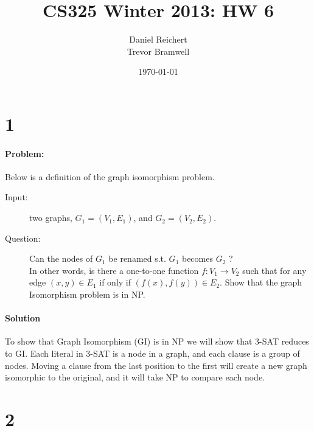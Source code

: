 \documentclass[12pt]{article}
\title{CS325 Winter 2013: HW 6}
\author{
    Daniel Reichert \\
    Trevor Bramwell \\
}
\date{\today}
\begin{document}
\maketitle
\section*{1}
\paragraph{Problem:}
Below is a definition of the graph isomorphism problem.\\
\begin{description}
\item[Input:]
        two graphs, $G_1 = (V_1 , E_1)$, and $G_2 = (V_2 , E_2)$.
\item[Question:] Can the nodes of $G_1$ be renamed s.t. $G_1$ becomes $G_2$ ?\\
        In other words, is there a one-to-one function $f : V_1 \rightarrow V_2$
        such that for any edge $(x, y) \in E_1$ if only if
        $(f (x), f (y)) \in E_2$. Show that the graph Isomorphism problem is in NP.
\end{description}

\paragraph{Solution}
    To show that Graph Isomorphism (GI) is in NP we will show that 3-SAT
reduces to GI. Each literal in 3-SAT is a node in a graph, and each
clause is a group of nodes. Moving a clause from the last position to
the first will create a new graph isomorphic to the original, and it
will take NP to compare each node.

\section*{2}
\end{document}
